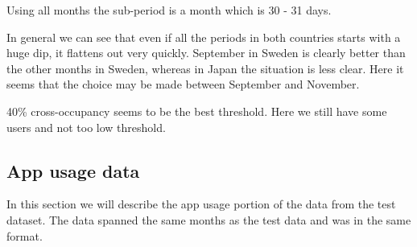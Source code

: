Using all months the sub-period is a month which is 30 - 31 days. 

In general we can see that even if all the periods in both countries starts with a huge dip, it flattens out very quickly. September in Sweden is clearly better than the other months in Sweden, whereas in Japan the situation is less clear. Here it seems that the choice may be made between September and November. 

40\% cross-occupancy seems to be the best threshold. Here we still have some users and not too low threshold. 

\subsection{App usage data}
In this section we will describe the app usage portion of the data from the test dataset.
The data spanned the same months as the test data and was in the same format.

